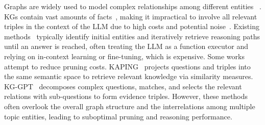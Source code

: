 


Graphs are widely used to model complex relationships among different entities ~\cite{tan2023higher,sima2024deep,lifan2024adarisk,lifan2024hypergraph}.
KGs contain vast amounts of facts~\cite{guo2019learning,DBLP:journals/pvldb/WuSWWZQL24,DBLP:journals/pvldb/WangWWZQZL24}, making it impractical to involve all relevant triples in the context of the LLM due to high costs and potential noise~\cite{wang2024llm}. Existing methods~\cite{tog1.0sun2023think, jiang2023structgpt, tog2.0ma2024think} typically identify initial entities and iteratively retrieve reasoning paths until an answer is reached, often treating the LLM as a function executor and relying on in-context learning or fine-tuning, which is expensive.
Some works attempt to reduce pruning costs. KAPING~\cite{baek2023knowledge} projects questions and triples into the same semantic space to retrieve relevant knowledge via similarity measures. KG-GPT~\cite{kim2023kg} decomposes complex questions, matches, and selects the relevant relations with sub-questions to form evidence triples. 
However, these methods often overlook the overall graph structure and the interrelations among multiple topic entities, leading to suboptimal pruning and reasoning performance.

